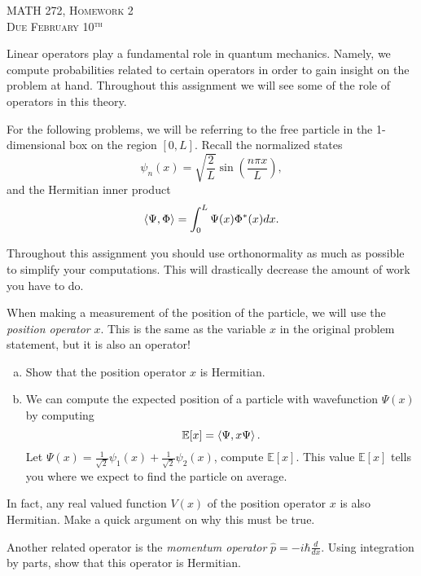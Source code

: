 \documentclass[12pt]{article} %
\begin{document}
\begin{center}
   \textsc{\large MATH 272, Homework 2}\\
   \textsc{Due February 10$^\textrm{th}$}
\end{center}
\vspace{.5cm}

Linear operators play a fundamental role in quantum mechanics. Namely, we compute probabilities related to certain operators in order to gain insight on the problem at hand.  Throughout this assignment we will see some of the role of operators in this theory.  

For the following problems, we will be referring to the free particle in the 1-dimensional box on the region $[0,L]$. Recall the normalized states
   \[
   \psi_n(x) = \sqrt{\frac{2}{L}} \sin\left(\frac{n\pi x}{L}\right),
   \]
   and the Hermitian inner product
   \[
   \left\langle \Psi, \Phi \right\rangle = \int_0^L \Psi(x)\Phi^*(x)dx.
   \]
   
   Throughout this assignment you should use orthonormality as much as possible to simplify your computations. This will drastically decrease the amount of work you have to do.

\begin{problem}
  When making a measurement of the position of the particle, we will use the \emph{position operator} $x$.  This is the same as the variable $x$ in the original problem statement, but it is also an operator!
   \begin{enumerate}[(a)]
   		\item Show that the position operator $x$ is Hermitian.
   		\item We can compute the expected position of a particle with wavefunction $\Psi(x)$ by computing
   		\[
   		\mathbb{E}[x]=\left\langle \Psi, x\Psi \right\rangle.
   		\]
   		Let $\Psi(x) = \frac{1}{\sqrt{2}} \psi_1(x) + \frac{1}{\sqrt{2}} \psi_2(x)$, compute $\mathbb{E}[x]$. This value $\mathbb{E}[x]$ tells you where we expect to find the particle on average.
   	\end{enumerate}
\end{problem}

\begin{problem}
	In fact, any real valued function $V(x)$ of the position operator $x$ is also Hermitian. Make a quick argument on why this must be true.
\end{problem}

\begin{problem}
	Another related operator is the \emph{momentum operator} $\hat{p} = -i\hbar \frac{d}{dx}$. Using integration by parts, show that this operator is Hermitian.
\end{problem}
\end{document}
